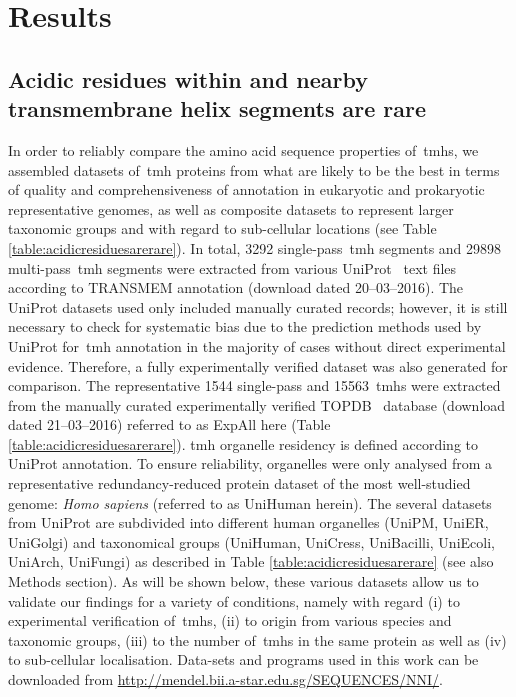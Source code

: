 \section{Results}

\subsection{Acidic residues within and nearby transmembrane helix segments are rare}

In order to reliably compare the amino acid sequence properties of~\gls{tmh}s, we assembled datasets of~\gls{tmh} proteins from what are likely to be the best in terms of quality and comprehensiveness of annotation in eukaryotic and prokaryotic representative genomes, as well as composite datasets to represent larger taxonomic groups and with regard to sub-cellular locations (see Table \ref{table:acidicresiduesarerare}).
In total, 3292 single\--pass~\gls{tmh} segments and 29898 multi\--pass~\gls{tmh} segments were extracted from various UniProt~\cite{TheUniProtConsortium2014} text files according to TRANSMEM annotation (download dated 20--03--2016).
The UniProt datasets used only included manually curated records; however, it is still necessary to check for systematic bias due to the prediction methods used by UniProt for~\gls{tmh} annotation in the majority of cases without direct experimental evidence.
Therefore, a fully experimentally verified dataset was also generated for comparison.
The representative 1544 single\--pass and 15563~\gls{tmh}s were extracted from the manually curated experimentally verified TOPDB~\cite{Dobson2015} database (download dated 21--03--2016) referred to as ExpAll here (Table \ref{table:acidicresiduesarerare}).
\gls{tmh} organelle residency is defined according to UniProt annotation.
To ensure reliability, organelles were only analysed from a representative redundancy-reduced protein dataset of the most well-studied genome: \textit{Homo sapiens} (referred to as UniHuman herein).
The several datasets from UniProt  are subdivided into different human organelles (UniPM, UniER, UniGolgi) and taxonomical groups (UniHuman, UniCress, UniBacilli, UniEcoli, UniArch, UniFungi) as described in Table \ref{table:acidicresiduesarerare} (see also Methods section).
As will be shown below, these various datasets allow us to validate our findings for a variety of conditions, namely with regard (i) to experimental verification of~\gls{tmh}s, (ii) to origin from various species and taxonomic groups, (iii) to the number of~\gls{tmh}s in the same protein as well as (iv) to sub-cellular localisation.
Data-sets and programs used in this work can be downloaded from \url{http://mendel.bii.a-star.edu.sg/SEQUENCES/NNI/}.

